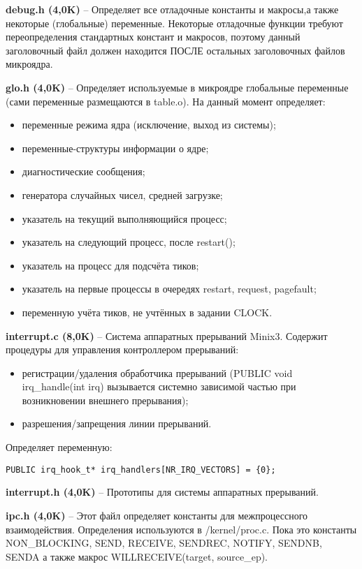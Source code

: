 \textbf{debug.h (4,0K)} -- Определяет все отладочные константы и макросы,а также некоторые (глобальные) переменные. Некоторые отладочные функции требуют переопределения стандартных констант и макросов, поэтому данный заголовочный файл должен находится ПОСЛЕ остальных заголовочных файлов микроядра.

\textbf{glo.h (4,0K)} -- Определяет используемые в микроядре глобальные переменные (сами переменные размещаются в table.o). На данный момент определяет:
\begin{itemize}
\item переменные режима ядра (исключение, выход из системы);
\item переменные-структуры информации о ядре;
\item диагностические сообщения;
\item генератора случайных чисел, средней загрузке;
\item указатель на текущий выполняющийся процесс;
\item указатель на следующий процесс, после restart();
\item указатель на процесс для подсчёта тиков;
\item указатель на первые процессы в очередях restart, request, pagefault;
\item переменную учёта тиков, не учтённых в задании CLOCK.
\end{itemize}

\textbf{interrupt.c (8,0K)} -- Система аппаратных прерываний Minix3. Содержит процедуры для
управления контроллером прерываний:
\begin{itemize}
\item регистрации/удаления обработчика прерываний (PUBLIC void irq\_handle(int irq) вызывается системно зависимой частью при возникновении внешнего прерывания);
\item разрешения/запрещения линии прерываний.
\end{itemize}
Определяет переменную:
\begin{Verbatim}[frame=single]
PUBLIC irq_hook_t* irq_handlers[NR_IRQ_VECTORS] = {0};
\end{Verbatim}

\textbf{interrupt.h (4,0K)} -- Прототипы для системы аппаратных прерываний.

\textbf{ipc.h (4,0K)} -- Этот файл определяет константы для межпроцессного взаимодействия. Определения используются в /kernel/proc.c. Пока это константы NON\_BLOCKING, SEND, RECEIVE, SENDREC,
NOTIFY, SENDNB, SENDA а также макрос WILLRECEIVE(target, source\_ep).

